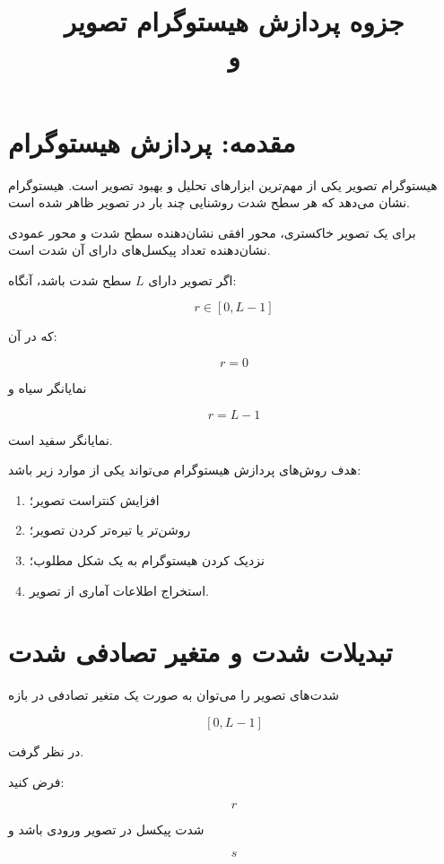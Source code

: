 \documentclass[12pt,a4paper]{article}
\title{جزوه پردازش هیستوگرام تصویر\\
	\large \lr{Histogram Equalization} و \lr{Histogram Matching}}
\author{}
\date{}
\begin{document}
	
	\maketitle
	\tableofcontents
	\newpage
	
	\section{مقدمه: پردازش هیستوگرام}
	
	هیستوگرام تصویر یکی از مهم‌ترین ابزارهای تحلیل و بهبود تصویر است.
	هیستوگرام نشان می‌دهد که هر سطح شدت روشنایی چند بار در تصویر ظاهر شده است.
	
	برای یک تصویر خاکستری، محور افقی نشان‌دهنده سطح شدت و محور عمودی
	نشان‌دهنده تعداد پیکسل‌های دارای آن شدت است.
	
	اگر تصویر دارای $L$ سطح شدت باشد، آنگاه:
	
	\[
	r \in [0,L-1]
	\]
	
	که در آن:
	
	\[
	r=0
	\]
	
	نمایانگر سیاه و
	
	\[
	r=L-1
	\]
	
	نمایانگر سفید است.
	
	هدف روش‌های پردازش هیستوگرام می‌تواند یکی از موارد زیر باشد:
	
	\begin{enumerate}
		\item افزایش کنتراست تصویر؛
		\item روشن‌تر یا تیره‌تر کردن تصویر؛
		\item نزدیک کردن هیستوگرام به یک شکل مطلوب؛
		\item استخراج اطلاعات آماری از تصویر.
	\end{enumerate}
	
	
	\section{تبدیلات شدت و متغیر تصادفی شدت}
	
	شدت‌های تصویر را می‌توان به صورت یک متغیر تصادفی در بازه
	
	\[
	[0,L-1]
	\]
	
	در نظر گرفت.
	
	فرض کنید:
	
	\[
	r
	\]
	
	شدت پیکسل در تصویر ورودی باشد و
	
	\[
	s
	\]
	
\end{document}
